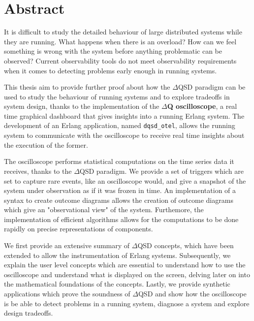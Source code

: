 \chapter*{Abstract}
    It is difficult to study the detailed behaviour of large distributed systems while they are running. What happens when there is an overload? How can we feel something is wrong with the system before anything problematic can be observed? Current observability tools do not meet observability requirements when it comes to detecting problems early enough in running systems. 
    
    This thesis aim to provide further proof about how the $\Delta$QSD paradigm can be used to study the behaviour of running systems and to explore tradeoffs in system design, thanks to the implementation of the \textbf{$\Delta$Q oscilloscope}, a real time graphical dashboard that gives insights into a running Erlang system. The development of an Erlang application, named \texttt{dqsd\_otel}, allows the running system to communicate with the oscilloscope to receive real time insights about the execution of the former.
    
    The oscilloscope performs statistical computations on the time series data it receives, thanks to the $\Delta$QSD paradigm. We provide a set of triggers which are set to capture rare events, like an oscilloscope would, and give a snapshot of the system under observation as if it was frozen in time. An implementation of a syntax to create outcome diagrams allows the creation of outcome diagrams which give an "observational view" of the system. Furthemore, the implementation of efficient algorithms allows for the computations to be done rapidly on precise representations of components.

    We first provide an extensive summary of $\Delta$QSD concepts, which have been extended to allow the instrumentation of Erlang systems. Subsequently, we explain the user level concepts which are essential to understand how to use the oscilloscope and understand what is displayed on the screen, delving later on into the mathematical foundations of the concepts. Lastly, we provide synthetic applications which prove the soundness of $\Delta$QSD and show how the oscilloscope is be able to detect problems in a running system, diagnose a system and explore design tradeoffs.

